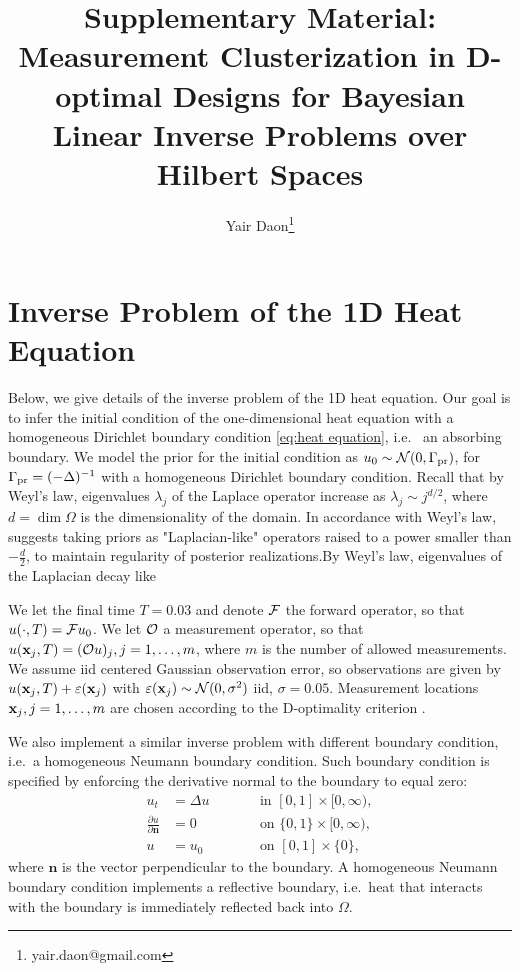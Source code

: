 \documentclass{article}
\title{Supplementary Material: Measurement Clusterization in D-optimal
  Designs for Bayesian Linear Inverse Problems over Hilbert Spaces}
\author{Yair Daon\thanks{yair.daon@gmail.com}}
\affil{Azrieli Faculty of Medicine, Bar Ilan University, Safed,
  Israel.}
\begin{document}
\maketitle



\section{Inverse Problem of the 1D Heat Equation}\label{subsec:1d heat}
Below, we give details of the inverse problem of the 1D heat
equation. Our goal is to infer the initial condition of the
one-dimensional heat equation with a homogeneous Dirichlet boundary
condition \ref{eq:heat equation}, i.e.~ an absorbing boundary. We
model the prior for the initial condition as $u_0 \sim
\mathcal{N}(0,\Gamma_{\textup{pr}})$, for $\Gamma_{\textup{pr}} = (-\Delta)^{-1}$ with a homogeneous
Dirichlet boundary condition. Recall that by Weyl's law, eigenvalues
$\lambda_j$ of the Laplace operator increase as $\lambda_j \sim
j^{d/2}$, where $d = \dim \Omega$ is the dimensionality of the
domain. In accordance with Weyl's law, \cite[Theorem 3.1]{Stuart10}
suggests taking priors as "Laplacian-like" operators raised to a power
smaller than $-\frac{d}{2}$, to maintain regularity of posterior
realizations.By Weyl's law, eigenvalues of the Laplacian decay like


We let the final time $T = 0.03$ and denote $\mathcal{F}$ the forward
operator, so that $u(\cdot, T) = \mathcal{F} u_0$. We let $\mathcal{O}$ a
measurement operator, so that $u(\mathbf{x}_j,T) = (\mathcal{O} u)_j, j=1,\dots,m$,
where $m$ is the number of allowed measurements. We assume iid
centered Gaussian observation error, so observations are given by
$u(\mathbf{x}_j,T) + \varepsilon(\mathbf{x}_j)$ with $\varepsilon(\mathbf{x}_j) \sim \mathcal{N}(0, \sigma^2)$
iid, $\sigma = 0.05$. Measurement locations $\mathbf{x}_j,j=1,\dots,m$ are
chosen according to the D-optimality criterion
\cite{AlexanderianGloorGhattas14}.

We also implement a similar inverse problem with different boundary
condition, i.e.~a homogeneous Neumann boundary condition. Such
boundary condition is specified by enforcing the derivative normal to
the boundary to equal zero:
\begin{subequations}\label{eq:neumann}
  \begin{alignat}{2}
    u_t &= \Delta u &&\qquad \text{in } [0,1] \times [0,\infty),\\
      \frac{\partial u}{\partial \mathbf{n}} &= 0 &&\qquad \text{on } \{0, 1\} \times [0,\infty),\\
        u &= u_0 &&\qquad \text{on }[0,1] \times \{0\},
  \end{alignat}
\end{subequations}
where $\mathbf{n}$ is the vector perpendicular to the boundary. A
homogeneous Neumann boundary condition implements a reflective
boundary, i.e.~heat that interacts with the boundary is immediately
reflected back into $\Omega$.
\end{document}
